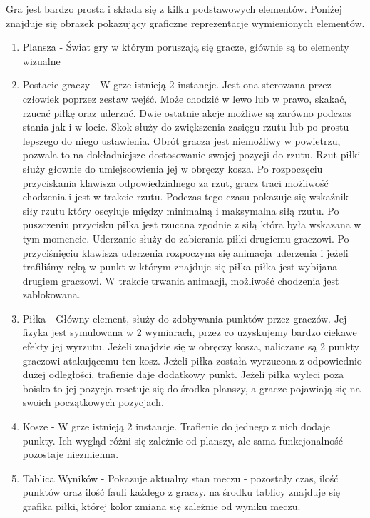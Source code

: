 \documentclass[a4paper,12pt,twoside,openany]{report}
\begin{document}
Gra jest bardzo prosta i składa się z kilku podstawowych elementów.
Poniżej znajduje się obrazek pokazujący graficzne reprezentacje wymienionych elementów.
\begin{enumerate}
    \item Plansza - Świat gry w którym poruszają się gracze, głównie są to elementy wizualne
    \item Postacie graczy - W grze istnieją 2 instancje. Jest ona sterowana przez człowiek poprzez zestaw wejść. Może chodzić w lewo lub w prawo, skakać, rzucać piłkę oraz uderzać. Dwie ostatnie akcje możliwe są zarówno podczas stania jak i w locie. Skok służy do zwiększenia zasięgu rzutu lub po prostu lepszego do niego ustawienia. Obrót gracza jest niemożliwy w powietrzu, pozwala to na dokładniejsze dostosowanie swojej pozycji do rzutu. Rzut piłki służy głownie do umiejscowienia jej w obręczy kosza. Po rozpoczęciu przyciskania klawisza odpowiedzialnego za rzut, gracz traci możliwość chodzenia i jest w trakcie rzutu. Podczas tego czasu pokazuje się wskaźnik siły rzutu który oscyluje między minimalną i maksymalna siłą rzutu. Po puszczeniu przycisku piłka jest rzucana zgodnie z siłą która była wskazana w tym momencie. Uderzanie służy do zabierania piłki drugiemu graczowi. Po przyciśnięciu klawisza uderzenia rozpoczyna się animacja uderzenia i jeżeli trafiliśmy ręką w punkt w którym znajduje się piłka piłka jest wybijana drugiem graczowi. W trakcie trwania animacji, możliwość chodzenia jest zablokowana.
    \item Piłka - Główny element, służy do zdobywania punktów przez graczów. Jej fizyka jest symulowana w 2 wymiarach, przez co uzyskujemy bardzo ciekawe efekty jej wyrzutu. Jeżeli znajdzie się w obręczy kosza, naliczane są 2 punkty graczowi atakującemu ten kosz. Jeżeli piłka została wyrzucona z odpowiednio dużej odległości, trafienie daje dodatkowy punkt. Jeżeli piłka wyleci poza boisko to jej pozycja resetuje się do środka planszy, a gracze pojawiają się na swoich początkowych pozycjach.
    \item Kosze -  W grze istnieją 2 instancje. Trafienie do jednego z nich dodaje punkty. Ich wygląd różni się zależnie od planszy, ale sama funkcjonalność pozostaje niezmienna.
    \item Tablica Wyników - Pokazuje aktualny stan meczu - pozostały czas, ilość punktów oraz ilość fauli każdego z graczy. na środku tablicy znajduje się grafika piłki, której kolor zmiana się zależnie od wyniku meczu.
\end{enumerate}
\end{document}

